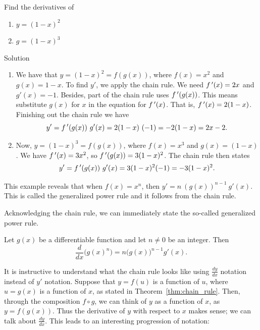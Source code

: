 \fi
\fi

\ifvc
\begin{example}\label{ex_chain2}
Find the derivatives of 
\begin{multicols}{2}
\begin{enumerate}
\item $y=(1-x)^2$
\item $g=(1-x)^3$
\end{enumerate}
\end{multicols}

Solution 

\begin{enumerate}
\item We have that $y=(1-x)^2 = f(g(x))$,  where $f(x) = x^2$ and $g(x) = 1-x$. To find $y'$, we apply the chain rule. We need $f\,'(x)=2x$ and $g'(x)=-1.$ Besides, part of the chain rule uses $f\,'(g(x))$. This means substitute $g(x)$ for $x$ in the equation for $f\,'(x)$. That is, $f\,'(x) = 2(1-x)$.  Finishing out the chain rule we have $$y' = f\,'(g(x))\ g'(x) = 2(1-x)\ (-1) = -2(1-x)= 2x-2.$$

\item Now, $y = (1-x)^3 = f(g(x))$, where $f(x) = x^3$ and $g(x) = (1-x)$. We have $f\,'(x) = 3x^2$, so $f\,'(g(x)) = 3(1-x)^2$. The chain rule then states $$y' = f\,'(g(x))\ g'(x) = 3(1-x)^2(-1) = -3(1-x)^2.$$
\end{enumerate}

\end{example}

This example reveals that when $f(x)=x^n$, then $y' =n\ (g(x))^{n-1}\ g'(x)$. This  is called the generalized power rule and it follows from the chain rule.
\fi

\ifcourse
Acknowledging the chain rule, we can immediately state the so-called generalized power rule. 
\fi

\begin{theorem}\label{thm:gen_power_rule}
Let $g(x)$ be a differentiable function and let $n\neq 0$ be an integer. Then $$\frac{d}{dx}\Big(g(x)^n\Big) = n \big(g(x)\big)^{n-1} g'(x).$$
\end{theorem}


It is instructive to understand what the  chain rule looks like using $\frac{dy}{dx}$ notation instead of $y'$ notation.  Suppose that $y=f(u)$ is a function of $u$, where $u=g(x)$ is a function of $x$, as stated in Theorem~\ref{thm:chain_rule}.  Then, through the composition $f \circ g$, we can think of $y$ as a function of $x$, as $y=f(g(x))$. Thus the derivative of $y$ with respect to $x$ makes sense; we can talk about $\frac{dy}{dx}.$  This leads to an interesting progression of notation:

